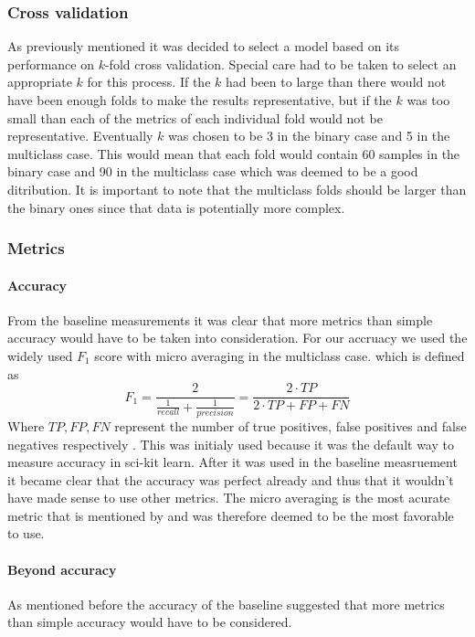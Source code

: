 \documentclass[british]{article}
\begin{document}
\subsubsection{Cross validation} As previously mentioned it was decided to select a model based on its performance on $k$-fold cross validation. Special care had to be taken to select an appropriate $k$ for this process. If the $k$ had been to large than there would not have been enough folds to make the results representative, but if the $k$ was too small than each of the metrics of each individual fold would not be representative. Eventually $k$ was chosen to be 3 in the binary case and 5 in the multiclass case. This would mean that each fold would contain 60 samples in the binary case and 90 in the multiclass case which was deemed to be a good ditribution. It is important to note that the multiclass folds should be larger than the binary ones since that data is potentially more complex. 

\subsubsection{Metrics}
\label{metrics} 

\paragraph{Accuracy}From the baseline measurements it was clear that more metrics than simple accuracy would have to be taken into consideration. For our accruacy we used the widely used $F_1$ score with micro averaging in the multiclass case. which is defined as $$F_1 = \frac{2}{\frac{1}{recall} + \frac{1}{precision}} = \frac{2\cdot TP}{2\cdot TP + FP + FN}$$ Where $TP, FP, FN$ represent the number of true positives, false positives and false negatives respectively \autocite{Lipton2014}. This was initialy used because it was the default way to measure accuracy in sci-kit learn. After it was used in the baseline measruement it became clear that the accuracy was perfect already and thus that it wouldn't have made sense to use other metrics. The micro averaging is the most acurate metric that is mentioned by \citeauthor{Lipton2014} and was therefore deemed to be the most favorable to use. 

\paragraph{Beyond accuracy} As mentioned before the accuracy of the baseline suggested that more metrics than simple accuracy would have to be considered.
\end{document}
